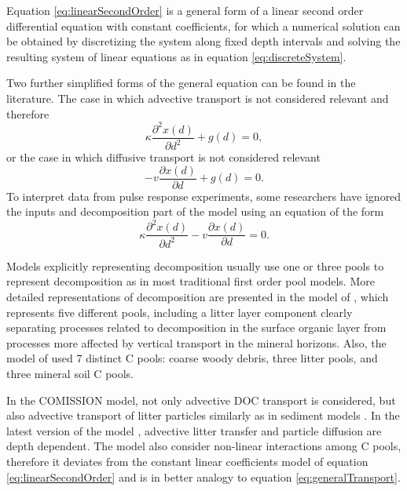\documentclass[11pt, oneside, a4paper]{article}   	%
\begin{document}
Equation \ref{eq:linearSecondOrder} is a general form of a linear second order differential equation with constant coefficients, for which a numerical solution can be obtained by discretizing the system along fixed depth intervals and solving the resulting system of linear equations as in equation \ref{eq:discreteSystem}.

Two further simplified forms of the general equation can be found in the literature. The case in which advective transport is not considered relevant \citep[e.g.][]{OBrien1978} and therefore
\begin{equation} \label{eq:linearDiffusion}
 \kappa \frac{\partial^2 x(d)}{\partial d^2}  + g(d) =0,
\end{equation}
or the case in which diffusive transport is not considered relevant \citep[e.g.][]{Feng1999, Baisden2002, Baisden2007}
\begin{equation} \label{eq:linearAdvection}
- v \frac{\partial x(d)}{\partial d} + g(d) =0.
\end{equation}
To interpret data from pulse response experiments, some researchers have ignored the inputs and decomposition part of the model \citep[e.g.][]{Bruun2007} using an equation of the form
\begin{equation} \label{eq:noDecomposition}
 \kappa \frac{\partial^2 x(d)}{\partial d^2} - v \frac{\partial x(d)}{\partial d} =0.
\end{equation}

Models explicitly representing decomposition usually use one or three pools to represent decomposition as in most traditional first order pool models. More detailed representations of decomposition are presented in the model of \citet{Braakhekke2011, Braakhekke2013}, which represents five different pools, including a litter layer component clearly separating processes related to decomposition in the surface organic layer from processes more affected by vertical transport in the mineral horizons. Also, the model of \citet{Koven2013BGS} used 7 distinct C pools: coarse woody debris, three litter pools, and three mineral soil C pools. 

In the COMISSION model, not only advective DOC transport is considered, but also advective transport of litter particles similarly as in sediment models \citep{Ahrens2015, Ahrens2020}. In the latest version of the model \citep{Ahrens2020}, advective litter transfer and particle diffusion are depth dependent. The model also consider non-linear interactions among C pools, therefore it deviates from the constant linear coefficients model of equation \ref{eq:linearSecondOrder} and is in better analogy to equation \ref{eq:generalTransport}.
\end{document}
